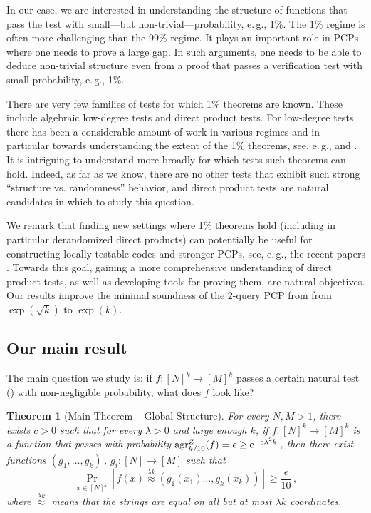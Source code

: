 \documentclass[11pt]{article}
\numberwithin{equation}{section}
\newtheorem{theorem}{Theorem}[section]
\theoremstyle{definition}
\theoremstyle{plain}
\newcommand{\eee}{\mathrm e}
\newcommand{\eg}{e.\,g.}
\newcommand{\Prob}[2][]{\Pr_{{#1}}\left[#2\right]} %
\newcommand{\Brac}[1]{\left[#1\right]} %
\newcommand\f{f} %
\newcommand\pf{g} %
\newcommand{\test}[2]{
	\ifx &#2&
	\textrm{agr}^{#1}
	\else	
	\textrm{agr}^{#1}_{#2}
	\fi}
\newcommand\neql[1]{\stackrel{{#1}}{ \approx}} %
\begin{document}
In our case, we are interested in understanding the structure of functions that pass the test with small---but non-trivial---probability, \eg, 1\%. The 1\% regime is often more challenging than the 99\% regime. It plays an important role in PCPs where one needs to prove a large gap. In such arguments, one needs to be able to deduce %
non-trivial  %
structure even from a proof that passes a verification test with small probability, \eg, 1\%.

There are very few families of tests for which 1\% theorems are known. These include algebraic %
low-degree  %
tests and direct product tests. For low-degree %
tests there has been a considerable amount of work in various regimes and in particular towards understanding the extent of the 1\% theorems, see, \eg, \cite{RaSa,ArSu,BDL17} and \cite{bergelson2010inverse}.
%
It is intriguing to understand more broadly for which tests such theorems can hold.  Indeed, as far as we know, there are no other tests that exhibit such strong ``structure vs. randomness'' behavior, and direct product tests are natural candidates in which to study this question.

We remark that finding new settings where 1\% theorems hold (including in particular derandomized direct products) can
%
potentially be  %
useful for constructing locally testable codes and stronger PCPs, see, \eg, the
%
%
recent papers \cite{KMS,DKKMS}.  %
Towards this goal,  %
gaining a more comprehensive understanding of direct product tests, as well as developing tools for proving them, %
are natural objectives.  %
Our results improve the minimal soundness of the $2$-query PCP from \cite{impagliazzo2012new} from $\exp(\sqrt{k})$ to $\exp(k)$.
\subsection{Our main result}
The main question we study is: if $\f:[N]^k\to[M]^k$ passes a certain natural test () with non-negligible probability, what does $f$ look like?
%
%
%
%

%

\begin{theorem}[Main Theorem -- Global Structure]\label{thm:global}
	For every $N,M>1$, there exists
%
%
$c > 0$ such that for every %
%
%
%
$\lambda>0$ and large enough $k$, if $\f:[N]^k \rightarrow[M]^k$ is a function that passes  with probability  $\test{Z}{k/10}(f) =\epsilon\geq \eee^{-c \lambda^2 k}$\,, then there exist functions $(\pf_1,\ldots, \pf_k)$\,, $\pf_i:[N]\rightarrow[M]$ such that
	\[\Prob[x\in\Brac{N}^k]{\f(x) \neql{\lambda k}( \pf_1(x_1)\ldots, \pf_k(x_k))} \geq \frac{\epsilon}{10}\,,\] %
%
%
where  %
$\neql{\lambda k}$ means that the strings are equal on all but at most $\lambda k$ coordinates.
\end{theorem}
\end{document}
